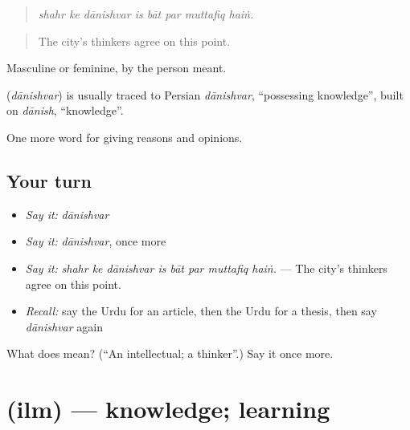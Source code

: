 \begin{quote}
       
\end{quote}

\begin{quote}
\emph{shahr ke dānishvar is bāt par muttafiq haiṅ.}
\end{quote}

\begin{quote}
The city's thinkers agree on this point.
\end{quote}

Masculine or feminine, by the person meant.

\begin{cousinweb}
\textbf{} (\emph{dānishvar}) is usually traced to Persian \emph{dānishvar}, \textquotedblleft{}possessing knowledge\textquotedblright{}, built on \emph{dānish}, \textquotedblleft{}knowledge\textquotedblright{}.
\end{cousinweb}

\begin{grammarlens}[title={What you've built}]
One more word for giving reasons and opinions.
\end{grammarlens}

\subsection*{Your turn}
\begin{itemize}
\raggedright
  \item \emph{Say it:} \emph{dānishvar}
  \item \emph{Say it:} \emph{dānishvar}, once more
  \item \emph{Say it:} \emph{shahr ke dānishvar is bāt par muttafiq haiṅ.} — The city's thinkers agree on this point.
  \item \emph{Recall:} say the Urdu for an article, then the Urdu for a thesis, then say \emph{dānishvar} again
\end{itemize}

\begin{tcolorbox}[breakable,colback=teal!4,colframe=teal!35!black,title={Before you move on}]
What does  mean? (\textquotedblleft{}An intellectual; a thinker\textquotedblright{}.) Say it once more.
\end{tcolorbox}
\section[\texorpdfstring{\ur{علم} (ilm)}{علم (ilm)}]{ (ilm) — knowledge; learning}

